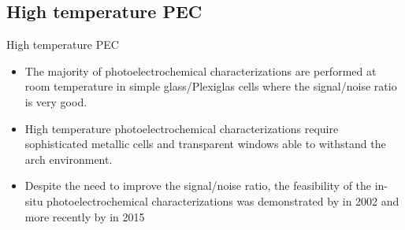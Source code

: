 \documentclass[10pt,compress]{beamer}
\begin{document}
\subsection{High temperature PEC}
    \begin{frame}[allowframebreaks=1.0]{High temperature PEC}
        \begin{itemize}
            \item The majority of photoelectrochemical characterizations are performed at 
            room temperature in simple glass/Plexiglas cells where the signal/noise 
            ratio is very good.
            \item High temperature photoelectrochemical characterizations 
            require sophisticated metallic cells and transparent windows 
            able to withstand the arch environment. 
            \item Despite the need to improve the signal/noise ratio, the feasibility of 
            the in-situ photoelectrochemical characterizations was demonstrated by 
            \citet{bojinov2002} in 2002 and more recently by \citet{skocic2016} in 2015 
        \end{itemize}


\end{frame}
\end{document}

